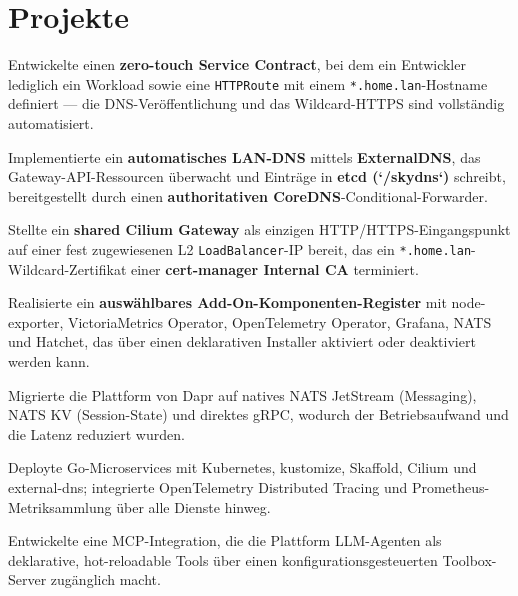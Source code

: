 \documentclass[10pt,a4paper]{resume}
\begin{document}
\vspace{2pt}

\section{Projekte}

\bullets
  \item Entwickelte einen \textbf{zero-touch Service Contract}, bei dem ein Entwickler lediglich ein Workload sowie eine \texttt{HTTPRoute} mit einem \texttt{*.home.lan}-Hostname definiert — die DNS-Veröffentlichung und das Wildcard-HTTPS sind vollständig automatisiert.
  \item Implementierte ein \textbf{automatisches LAN-DNS} mittels \textbf{ExternalDNS}, das Gateway-API-Ressourcen überwacht und Einträge in \textbf{etcd (`/skydns`)} schreibt, bereitgestellt durch einen \textbf{authoritativen CoreDNS}-Conditional-Forwarder.
  \item Stellte ein \textbf{shared Cilium Gateway} als einzigen HTTP/HTTPS-Eingangspunkt auf einer fest zugewiesenen L2 \texttt{LoadBalancer}-IP bereit, das ein \texttt{*.home.lan}-Wildcard-Zertifikat einer \textbf{cert-manager Internal CA} terminiert.
  \item Realisierte ein \textbf{auswählbares Add-On-Komponenten-Register} mit node-exporter, VictoriaMetrics Operator, OpenTelemetry Operator, Grafana, NATS und Hatchet, das über einen deklarativen Installer aktiviert oder deaktiviert werden kann.
\bulletsend
\vspace{1.0pt}
\bullets
  \item Migrierte die Plattform von Dapr auf natives NATS JetStream (Messaging), NATS KV (Session-State) und direktes gRPC, wodurch der Betriebsaufwand und die Latenz reduziert wurden.
  \item Deployte Go-Microservices mit Kubernetes, kustomize, Skaffold, Cilium und external-dns; integrierte OpenTelemetry Distributed Tracing und Prometheus-Metriksammlung über alle Dienste hinweg.
  \item Entwickelte eine MCP-Integration, die die Plattform LLM-Agenten als deklarative, hot-reloadable Tools über einen konfigurationsgesteuerten Toolbox-Server zugänglich macht.
\bulletsend
\end{document}
